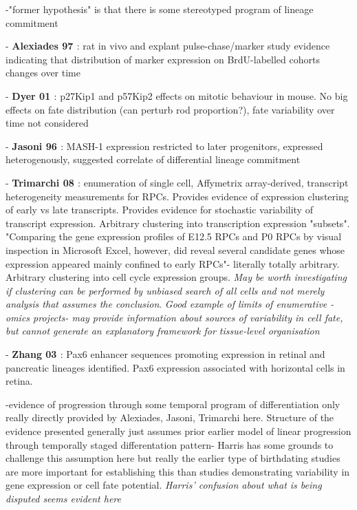 \documentclass{ut-thesis}
\begin{document}
-"former hypothesis" is that there is some stereotyped program of lineage commitment

- \textbf{Alexiades 97 \cite{Alexiades1997}}: rat in vivo and explant pulse-chase/marker study evidence indicating that distribution of marker expression on BrdU-labelled cohorts changes over time

- \textbf{Dyer 01 \cite{Dyer2001}}: p27Kip1 and p57Kip2 effects on mitotic behaviour in mouse. No big effects on fate distribution (can perturb rod proportion?), fate variability over time not considered

- \textbf{Jasoni 96 \cite{Jasoni1996}}: MASH-1 expression restricted to later progenitors, expressed heterogenously, suggested correlate of differential lineage commitment

- \textbf{Trimarchi 08 \cite{Trimarchi2008}}: enumeration of single cell, Affymetrix array-derived, transcript heterogeneity measurements for RPCs. Provides evidence of expression clustering of early vs late transcripts. Provides evidence for stochastic variability of transcript expression. Arbitrary clustering into transcription expression "subsets". "Comparing the gene expression profiles of E12.5
RPCs and P0 RPCs by visual inspection in Microsoft Excel, however, did reveal several candidate genes whose expression appeared mainly confined to early RPCs"- literally totally arbitrary. Arbitrary clustering into cell cycle expression groups. \textit{May be worth investigating if clustering can be performed by unbiased search of all cells and not merely analysis that assumes the conclusion}.  \textit{Good example of limits of enumerative -omics projects- may provide information about sources of variability in cell fate, but cannot generate an explanatory framework for tissue-level organisation}

- \textbf{Zhang 03 \cite{Zhang2003}}: Pax6 enhancer sequences promoting expression in retinal and pancreatic lineages identified. Pax6 expression associated with horizontal cells in retina.

-evidence of progression through some temporal program of differentiation only really directly provided by Alexiades, Jasoni, Trimarchi here. Structure of the evidence presented generally just assumes prior earlier model of linear progression through temporally staged differentation pattern- Harris has some grounds to challenge this assumption here but really the earlier type of birthdating studies are more important for establishing this than studies demonstrating variability in gene expression or cell fate potential. \textit{Harris' confusion about what is being disputed seems evident here}
\end{document}
